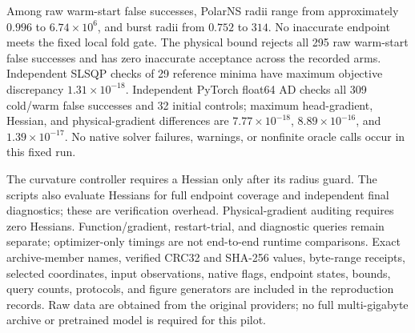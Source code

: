 Among raw warm-start false successes, PolarNS radii range from approximately $0.996$ to $6.74\times10^6$, and burst radii from $0.752$ to $314$. No inaccurate endpoint meets the fixed local fold gate. The physical bound rejects all 295 raw warm-start false successes and has zero inaccurate acceptance across the recorded arms. Independent SLSQP checks of 29 reference minima have maximum objective discrepancy $1.31\times10^{-18}$. Independent PyTorch float64 AD checks all 309 cold/warm false successes and 32 initial controls; maximum head-gradient, Hessian, and physical-gradient differences are $7.77\times10^{-18}$, $8.89\times10^{-16}$, and $1.39\times10^{-17}$. No native solver failures, warnings, or nonfinite oracle calls occur in this fixed run.

The curvature controller requires a Hessian only after its radius guard. The scripts also evaluate Hessians for full endpoint coverage and independent final diagnostics; these are verification overhead. Physical-gradient auditing requires zero Hessians. Function/gradient, restart-trial, and diagnostic queries remain separate; optimizer-only timings are not end-to-end runtime comparisons. Exact archive-member names, verified CRC32 and SHA-256 values, byte-range receipts, selected coordinates, input observations, native flags, endpoint states, bounds, query counts, protocols, and figure generators are included in the reproduction records. Raw data are obtained from the original providers; no full multi-gigabyte archive or pretrained model is required for this pilot.
